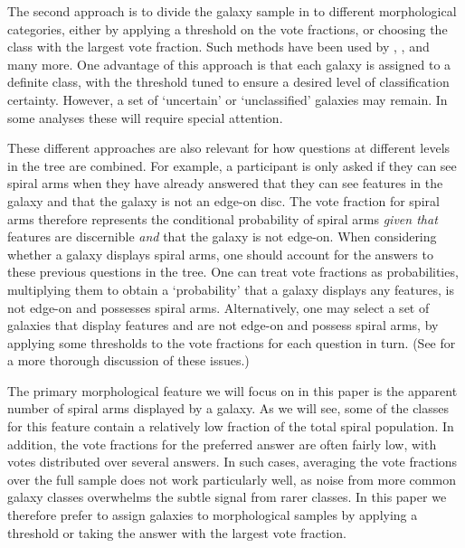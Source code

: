 \documentclass[useAMS,usenatbib]{mn2e}
\begin{document}
The second approach is to divide the galaxy sample in to different morphological categories, either by applying a threshold on the vote fractions, or choosing the class with the largest vote fraction. Such methods have been used by \citet{Land_08}, \citet{Skibba_09}, and many more.  One advantage of this approach is that each galaxy is assigned to a definite class, with the threshold tuned to ensure a desired level of classification certainty.  However, a set of `uncertain' or `unclassified' galaxies may remain.  In some analyses these will require special attention.

These different approaches are also relevant for how questions at different levels in the tree are combined.  For example, a participant is only asked if they can see spiral arms when they have already answered that they can see features in the galaxy and that the galaxy is not an edge-on disc.  The vote fraction for spiral arms therefore represents the conditional probability of spiral arms \emph{given that} features are discernible \emph{and} that the galaxy is not edge-on. When considering whether a galaxy displays spiral arms, one should account for the answers to these previous questions in the tree.  One can treat vote fractions as probabilities, multiplying them to obtain a `probability' that a galaxy displays any features, is not edge-on and possesses spiral arms.  Alternatively, one may select a set of galaxies that display features and are not edge-on and possess spiral arms, by applying some thresholds to the vote fractions for each question in turn. (See \citet{Casteels_13} for a more thorough discussion of these issues.)

The primary morphological feature we will focus on in this paper is the apparent number of spiral arms displayed by a galaxy.  As we will see, some of the classes for this feature contain a relatively low fraction of the total spiral population.  In addition, the vote fractions for the preferred answer are often fairly low, with votes distributed over several answers.  In such cases, averaging the vote fractions over the full sample does not work particularly well, as noise from more common galaxy classes overwhelms the subtle signal from rarer classes.  In this paper we therefore prefer to assign galaxies to morphological samples by applying a threshold or taking the answer with the largest vote fraction.

\end{document}
